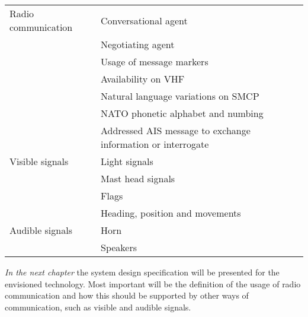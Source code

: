 \begin{table}[hbtp]
	\centering
	\begin{tabular}{l|l}
		\toprule
		Radio communication & Conversational agent \\
		& Negotiating agent \\
		& Usage of message markers \\
		& Availability on \ac{VHF} \\
		& Natural language variations on \ac{SMCP} \\
		& NATO phonetic alphabet and numbing \\
		& Addressed \ac{AIS} message to exchange information or interrogate \\
		\midrule
		Visible signals & Light signals \\
		& Mast head signals \\
		& Flags \\
		& Heading, position and movements \\
		\midrule
		Audible signals & Horn \\
		& Speakers\\
		\bottomrule
	\end{tabular}
	
	\label{tab:envisioned-technology}
\end{table}


\vspace{1.5cm}
\emph{In the next chapter} the system design specification will be presented for the envisioned technology. Most important will be the definition of the usage of radio communication and how this should be supported by other ways of communication, such as visible and audible signals.
